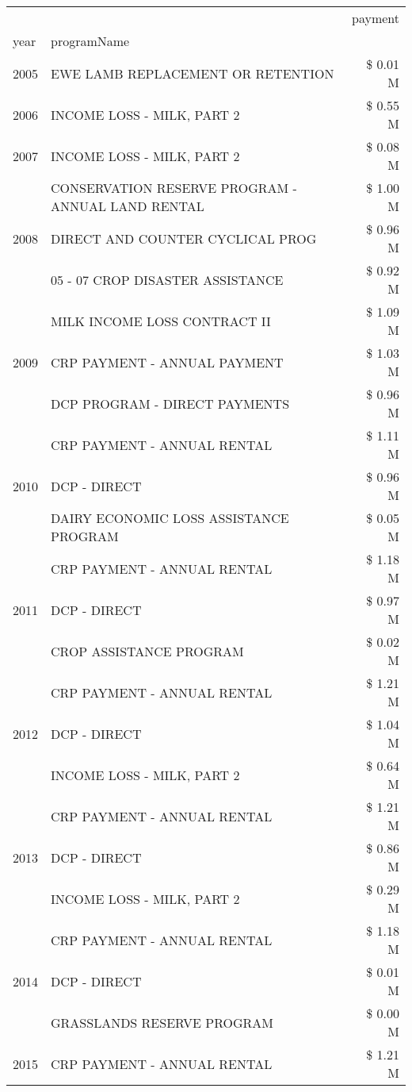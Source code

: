 \begin{tabular}{llr}
\toprule
 &  & payment \\
year & programName &  \\
\midrule
2005 & EWE LAMB REPLACEMENT OR RETENTION & \$ 0.01 M \\
\cline{1-3}
2006 & INCOME LOSS - MILK, PART 2 & \$ 0.55 M \\
\cline{1-3}
2007 & INCOME LOSS - MILK, PART 2 & \$ 0.08 M \\
\cline{1-3}
\multirow[t]{3}{*}{2008} & CONSERVATION RESERVE PROGRAM - ANNUAL LAND RENTAL & \$ 1.00 M \\
 & DIRECT AND COUNTER CYCLICAL PROG & \$ 0.96 M \\
 & 05 - 07 CROP DISASTER ASSISTANCE & \$ 0.92 M \\
\cline{1-3}
\multirow[t]{3}{*}{2009} & MILK INCOME LOSS CONTRACT II & \$ 1.09 M \\
 & CRP PAYMENT - ANNUAL PAYMENT & \$ 1.03 M \\
 & DCP PROGRAM - DIRECT PAYMENTS & \$ 0.96 M \\
\cline{1-3}
\multirow[t]{3}{*}{2010} & CRP PAYMENT - ANNUAL RENTAL & \$ 1.11 M \\
 & DCP - DIRECT & \$ 0.96 M \\
 & DAIRY ECONOMIC LOSS ASSISTANCE PROGRAM & \$ 0.05 M \\
\cline{1-3}
\multirow[t]{3}{*}{2011} & CRP PAYMENT - ANNUAL RENTAL & \$ 1.18 M \\
 & DCP - DIRECT & \$ 0.97 M \\
 & CROP ASSISTANCE PROGRAM & \$ 0.02 M \\
\cline{1-3}
\multirow[t]{3}{*}{2012} & CRP PAYMENT - ANNUAL RENTAL & \$ 1.21 M \\
 & DCP - DIRECT & \$ 1.04 M \\
 & INCOME LOSS - MILK, PART 2 & \$ 0.64 M \\
\cline{1-3}
\multirow[t]{3}{*}{2013} & CRP PAYMENT - ANNUAL RENTAL & \$ 1.21 M \\
 & DCP - DIRECT & \$ 0.86 M \\
 & INCOME LOSS - MILK, PART 2 & \$ 0.29 M \\
\cline{1-3}
\multirow[t]{3}{*}{2014} & CRP PAYMENT - ANNUAL RENTAL & \$ 1.18 M \\
 & DCP - DIRECT & \$ 0.01 M \\
 & GRASSLANDS RESERVE PROGRAM & \$ 0.00 M \\
\cline{1-3}
\multirow[t]{3}{*}{2015} & CRP PAYMENT - ANNUAL RENTAL & \$ 1.21 M \\

\end{tabular}
